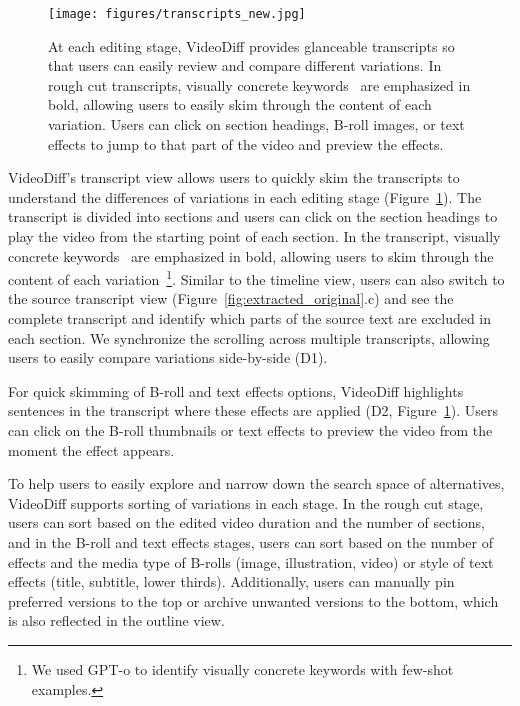 \begin{figure}[t]
  \centering
  \texttt{[image: figures/transcripts\_new.jpg]}
  \caption{At each editing stage, VideoDiff provides glanceable transcripts so that users can easily review and compare different variations. In rough cut transcripts, visually concrete keywords~\cite{leake2020generating} are emphasized in bold, allowing users to easily skim through the content of each variation. Users can click on section headings, B-roll images, or text effects to jump to that part of the video and preview the effects.}\label{fig:transcripts}
\end{figure}

VideoDiff's transcript view allows users to quickly skim the transcripts to understand the differences of variations in each editing stage (Figure~\ref{fig:transcripts}). 
The transcript is divided into sections and users can click on the section headings to play the video from the starting point of each section.
In the transcript, visually concrete keywords~\cite{leake2017computational} are emphasized in bold, allowing users to skim through the content of each variation~\footnote{We used GPT-o to identify visually concrete keywords with few-shot examples.}.
Similar to the timeline view, users can also switch to the source transcript view (Figure~\ref{fig:extracted_original}.c) and see the complete transcript and identify which parts of the source text are excluded in each section. We synchronize the scrolling across multiple transcripts, allowing users to easily compare variations side-by-side (D1). 

For quick skimming of B-roll and text effects options, VideoDiff highlights sentences in the transcript where these effects are applied (D2, Figure~\ref{fig:transcripts}). Users can click on the B-roll thumbnails or text effects to preview the video from the moment the effect appears.


To help users to easily explore and narrow down the search space of alternatives, VideoDiff supports sorting of variations in each stage. In the rough cut stage, users can sort based on the edited video duration and the number of sections, and in the B-roll and text effects stages, users can sort based on the number of effects and the media type of B-rolls (image, illustration, video) or style of text effects (title, subtitle, lower thirds). 
Additionally, users can manually pin preferred versions to the top or archive unwanted versions to the bottom, which is also reflected in the outline view.

